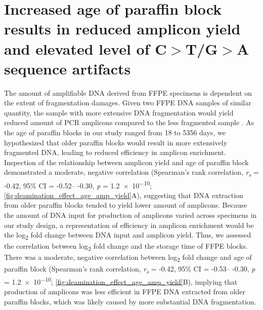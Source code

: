 \newpage
\section{Increased age of paraffin block results in reduced amplicon yield and elevated level of C$>$T/G$>$A sequence artifacts}
\label{sec:IncreasedageofparaffinblockresultsinpoorerampliconyieldandelevatedeventsofC$>$T/G$>$Asequenceartifacts}

The amount of amplifiable DNA derived from FFPE specimens is dependent on the extent of fragmentation damages. Given two FFPE DNA samples of similar quantity, the sample with more extensive DNA fragmentation would yield reduced amount of PCR amplicons compared to the less fragmented sample \cite{Didelot2013, Wong2014}. As the age of paraffin blocks in our study ranged from 18 to 5356 days, we hypothesized that older paraffin blocks would result in more extensively fragmented DNA, leading to reduced efficiency in amplicon enrichment. Inspection of the relationship between amplicon yield and age of paraffin block demonstrated a moderate, negative correlation (Spearman's rank correlation, \textit{r\textsubscript{s}} = -0.42, 95\% \acs{CI} = -0.52-- -0.30, \textit{p} = \num{1.2e-10}; \autoref{fig:deamination_effect_age_amp_yield}A), suggesting that DNA extraction from older paraffin blocks tended to yield lower amount of amplicons. Because the amount of DNA input for production of amplicons varied across specimens in our study design, a representation of efficiency in amplicon enrichment would be the log\textsubscript{2} fold change between DNA input and amplicon yield. Thus, we assessed the correlation between log\textsubscript{2} fold change and the storage time of FFPE blocks. There was a moderate, negative correlation between log\textsubscript{2} fold change and age of paraffin block (Spearman's rank correlation, \textit{r\textsubscript{s}} = -0.42, 95\% CI = -0.53-- -0.30, \textit{p} = \num{1.2e-10}; \autoref{fig:deamination_effect_age_amp_yield}B), implying that production of amplicons was less efficient in FFPE DNA extracted from older paraffin blocks, which was likely caused by more substantial DNA fragmentation.

